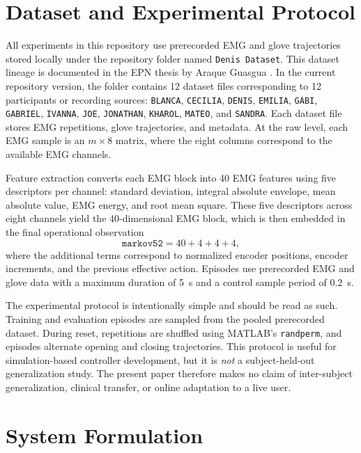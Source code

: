 \documentclass[conference]{IEEEtran}
\begin{document}
\section{Dataset and Experimental Protocol}
All experiments in this repository use prerecorded EMG and glove trajectories stored locally under the repository folder named \texttt{Denis Dataset}. This dataset lineage is documented in the EPN thesis by Araque Guasgua \cite{araque2024thesis}. In the current repository version, the folder contains 12 dataset files corresponding to 12 participants or recording sources: \texttt{BLANCA}, \texttt{CECILIA}, \texttt{DENIS}, \texttt{EMILIA}, \texttt{GABI}, \texttt{GABRIEL}, \texttt{IVANNA}, \texttt{JOE}, \texttt{JONATHAN}, \texttt{KHAROL}, \texttt{MATEO}, and \texttt{SANDRA}. Each dataset file stores EMG repetitions, glove trajectories, and metadata. At the raw level, each EMG sample is an $m \times 8$ matrix, where the eight columns correspond to the available EMG channels.

Feature extraction converts each EMG block into 40 EMG features using five descriptors per channel: standard deviation, integral absolute envelope, mean absolute value, EMG energy, and root mean square. These five descriptors across eight channels yield the 40-dimensional EMG block, which is then embedded in the final operational observation
\begin{equation}
\texttt{markov52} = 40 + 4 + 4 + 4,
\end{equation}
where the additional terms correspond to normalized encoder positions, encoder increments, and the previous effective action. Episodes use prerecorded EMG and glove data with a maximum duration of 5~s and a control sample period of 0.2~s.

The experimental protocol is intentionally simple and should be read as such. Training and evaluation episodes are sampled from the pooled prerecorded dataset. During reset, repetitions are shuffled using MATLAB's \texttt{randperm}, and episodes alternate opening and closing trajectories. This protocol is useful for simulation-based controller development, but it is \emph{not} a subject-held-out generalization study. The present paper therefore makes no claim of inter-subject generalization, clinical transfer, or online adaptation to a live user.

\section{System Formulation}
\end{document}
